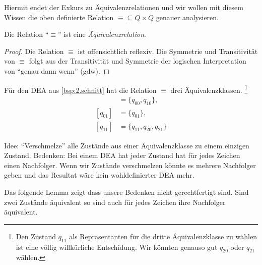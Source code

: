 Hiermit endet der Exkurs zu Äquivalenzrelationen und wir wollen mit diesem Wissen die oben definierte Relation $\equiv\subseteq Q\times Q$ genauer analysieren.

\begin{lemma}[name={[$\equiv$ ist Äquivalenzrelation]}] %
        Die Relation "`$\equiv$"' ist eine \emph{Äquivalenzrelation}.
\end{lemma}
\begin{proof}

  Die Relation $\equiv$ ist offensichtlich reflexiv.
  Die Symmetrie und Transitivität von $\equiv$ folgt aus der Transitivität und Symmetrie der logischen Interpretation von "`genau dann wenn"' (gdw).
\end{proof}


\begin{Bsp} 
Für den \ac{DEA} aus \autoref{bsp:2.schnitt} hat die Relation $\equiv$ drei Äquivalenzklassen.
\footnote{Den Zustand $q_{11}$ als Repräsentanten für die dritte Äquivalenzklasse zu wählen ist eine völlig willkürliche Entschidung. 
Wir könnten genauso gut $q_{20}$ oder $q_{21}$ wählen.}
\begin{align*}
 [q_{00}] & = \{q_{00}, q_{10}\},\\
 [q_{01}] & = \{q_{01}\},\\
 [q_{11}] & = \{q_{11}, q_{20}, q_{21}\}
\end{align*}
\end{Bsp}





Idee: "`Verschmelze"' alle Zustände aus einer Äquivalenzklasse zu einem einzigen Zustand.
Bedenken: Bei einem \ac{DEA} hat jeder Zustand hat für jedes Zeichen einen Nachfolger. 
Wenn wir Zustände verschmelzen könnte es mehrere Nachfolger geben und das Resultat wäre kein wohldefinierter \ac{DEA} mehr.

Das folgende Lemma zeigt dass unsere Bedenken nicht gerechtfertigt sind. 
Sind zwei Zustände äquivalent so sind auch für jedes Zeichen ihre Nachfolger äquivalent.


